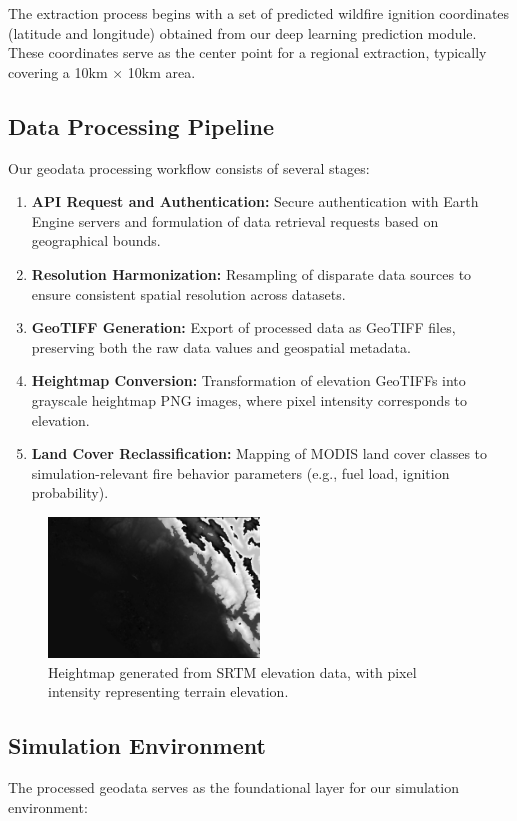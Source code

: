 \documentclass[conference]{IEEEtran}
\begin{document}
\noindent
The extraction process begins with a set of predicted wildfire ignition coordinates (latitude and longitude) obtained from our deep learning prediction module. These coordinates serve as the center point for a regional extraction, typically covering a 10km × 10km area.

\subsection{Data Processing Pipeline}
Our geodata processing workflow consists of several stages:

\begin{enumerate}
    \item \textbf{API Request and Authentication:} Secure authentication with Earth Engine servers and formulation of data retrieval requests based on geographical bounds.
    \item \textbf{Resolution Harmonization:} Resampling of disparate data sources to ensure consistent spatial resolution across datasets.
    \item \textbf{GeoTIFF Generation:} Export of processed data as GeoTIFF files, preserving both the raw data values and geospatial metadata.
    \item \textbf{Heightmap Conversion:} Transformation of elevation GeoTIFFs into grayscale heightmap PNG images, where pixel intensity corresponds to elevation.
    \item \textbf{Land Cover Reclassification:} Mapping of MODIS land cover classes to simulation-relevant fire behavior parameters (e.g., fuel load, ignition probability).
\end{enumerate}

\begin{figure}[h!]
\centering
\includegraphics[width=0.5\textwidth]{heightmap.png}
\caption{Heightmap generated from SRTM elevation data, with pixel intensity representing terrain elevation.}
\end{figure}

\subsection{Simulation Environment}
The processed geodata serves as the foundational layer for our simulation environment:
\end{document}
